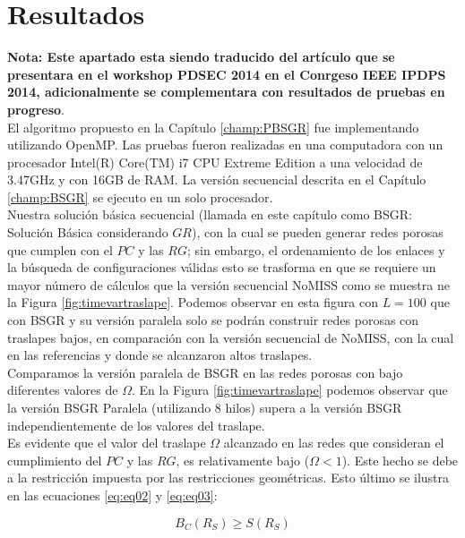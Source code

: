 \chapter{Resultados}
\label{champ:results}
\bigskip
\barra
\bigskip

\textbf{Nota: Este apartado esta siendo traducido del artículo que se presentara en el workshop PDSEC 2014 en el Conrgeso IEEE IPDPS 2014, adicionalmente se complementara con resultados de pruebas en progreso}.\\

El algoritmo propuesto en la Capítulo \ref{champ:PBSGR} fue implementando utilizando OpenMP. Las pruebas fueron realizadas en una computadora con un procesador Intel(R) Core(TM) i7 CPU  Extreme Edition a una velocidad de 3.47GHz y con 16GB de RAM. La versión secuencial descrita en el Capítulo \ref{champ:BSGR} se ejecuto en un solo procesador.\\

Nuestra solución básica secuencial (llamada en este capítulo como BSGR: Solución Básica considerando $GR$), con la cual se pueden generar redes porosas que cumplen con el $PC$ y las $RG$; sin embargo, el ordenamiento de los enlaces y la búsqueda de configuraciones válidas esto se trasforma en que se requiere un mayor número de cálculos que la versión secuencial NoMISS como se muestra ne la Figura \ref{fig:timevartraslape}. Podemos observar en esta figura  con $L=100$ que con BSGR y su versión paralela solo se podrán construir redes porosas con traslapes bajos, en comparación con la versión secuencial de NoMISS, con la cual en las referencias \cite{ref4} y \cite{ref3} donde se alcanzaron altos traslapes.\\

Comparamos la versión paralela de BSGR en las redes porosas con bajo diferentes valores de $\Omega$. En la Figura \ref{fig:timevartraslape} podemos observar que la versión BSGR Paralela (utilizando 8 hilos) supera a la versión BSGR independientemente de los valores del traslape.\\

Es evidente que el valor del traslape $\Omega$ alcanzado en las redes que consideran el cumplimiento del $PC$ y las $RG$, es relativamente bajo ($\Omega<1$). Este hecho se debe a la restricción impuesta por las restricciones geométricas. Esto último se ilustra en las ecuaciones \ref{eq:eq02} y \ref{eq:eq03}:

\begin{equation}
B_C(R_S) \geq S(R_S)
\label{eq:eq02}
\end{equation}

